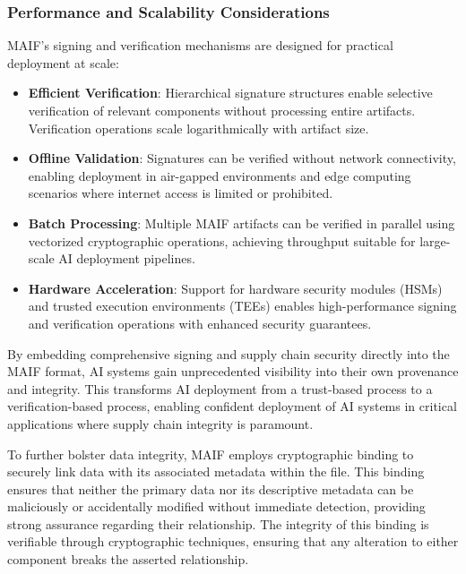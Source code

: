 \documentclass[conference]{IEEEtran}
\begin{document}
\subsubsection{Performance and Scalability Considerations}

MAIF's signing and verification mechanisms are designed for practical deployment at scale:

\begin{itemize}[leftmargin=*]
\item \textbf{Efficient Verification}: Hierarchical signature structures enable selective verification of relevant components without processing entire artifacts. Verification operations scale logarithmically with artifact size.

\item \textbf{Offline Validation}: Signatures can be verified without network connectivity, enabling deployment in air-gapped environments and edge computing scenarios where internet access is limited or prohibited.

\item \textbf{Batch Processing}: Multiple MAIF artifacts can be verified in parallel using vectorized cryptographic operations, achieving throughput suitable for large-scale AI deployment pipelines.

\item \textbf{Hardware Acceleration}: Support for hardware security modules (HSMs) and trusted execution environments (TEEs) enables high-performance signing and verification operations with enhanced security guarantees.
\end{itemize}

By embedding comprehensive signing and supply chain security directly into the MAIF format, AI systems gain unprecedented visibility into their own provenance and integrity. This transforms AI deployment from a trust-based process to a verification-based process, enabling confident deployment of AI systems in critical applications where supply chain integrity is paramount.

To further bolster data integrity, MAIF employs cryptographic binding to securely link data with its associated metadata within the file\cite{ref66}. This binding ensures that neither the primary data nor its descriptive metadata can be maliciously or accidentally modified without immediate detection, providing strong assurance regarding their relationship\cite{ref66}. The integrity of this binding is verifiable through cryptographic techniques, ensuring that any alteration to either component breaks the asserted relationship\cite{ref66}.
\end{document}
